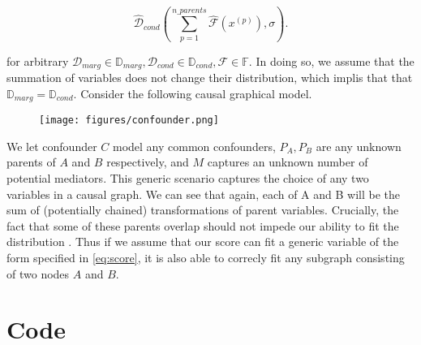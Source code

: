 \documentclass{article}
\begin{document}
\begin{equation}
    \widehat{\mathcal{D}}_{cond}(\sum_{p=1}^{n\_parents}\widehat{\mathcal{F}}(x^{(p)}), \sigma).
    \label{eq:score}
\end{equation}

for arbitrary $\mathcal{D}_{marg} \in \mathbb{D}_{marg}, \mathcal{D}_{cond} \in \mathbb{D}_{cond}, \mathcal{F} \in \mathbb{F}$.
In doing so, we assume that the summation of variables does not change their distribution, which implis that that $\mathbb{D}_{marg} = \mathbb{D}_{cond}$.
Consider the following causal graphical model.
\begin{figure}[H]
    \centerline{\texttt{[image: figures/confounder.png]}}
\end{figure}
We let confounder $C$ model any common confounders, $P_A, P_B$ are any unknown parents of $A$ and $B$ respectively, and $M$ captures an unknown number of potential mediators. This generic scenario captures the choice of any two variables in a causal graph. We can see that again, each of A and B will be the sum of (potentially chained) transformations of parent variables. Crucially, the fact that some of these parents overlap should not impede our ability to fit the distribution . Thus if we assume that our score can fit a generic variable of the form specified in \cref{eq:score}, it is also able to correcly fit any subgraph consisting of two nodes $A$ and $B$.



\section{Code}



\clearpage
\printbibliography
\end{document}
